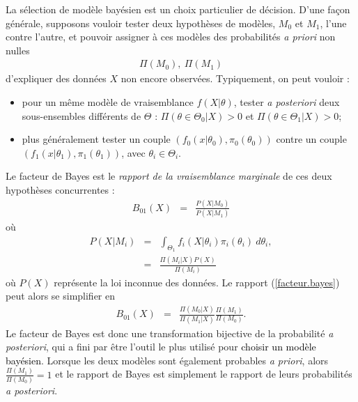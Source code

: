 La sélection de modèle bayésien est un choix particulier de décision. D'une fa\c con générale, supposons vouloir tester deux hypothèses de modèles, $M_0$ et $M_1$, l'une contre l'autre, et pouvoir assigner à ces modèles des probabilités {\it a priori} non nulles
\begin{eqnarray*}
\Pi(M_0), \ \Pi(M_1)
\end{eqnarray*}
d'expliquer des données $X$ non encore observées. Typiquement, on peut vouloir :
\begin{itemize}
    \item pour un même modèle de vraisemblance $f(X|\theta)$, tester {\it a posteriori} deux sous-ensembles  différents de $\Theta$ : $\Pi(\theta\in\Theta_0|X)>0$ et $\Pi(\theta\in\Theta_1|X)>0$;%
    \item plus généralement tester un couple $(f_0(x|\theta_0),\pi_0(\theta_0))$ contre un couple $(f_1(x|\theta_1),\pi_1(\theta_1))$, avec $\theta_i\in\Theta_i$. %
\end{itemize}
 Le facteur de Bayes est le \emph{rapport de  la vraisemblance marginale} de ces deux hypothèses concurrentes :
 \begin{eqnarray}
 B_{01}(X) & = & \frac{P(X|M_0)}{P(X|M_1)}\label{facteur.bayes}
 \end{eqnarray}
 où 
 \begin{eqnarray*}
 P(X|M_i) & = & \int_{\Theta_1} f_i(X|\theta_i)\pi_i(\theta_i) \ d\theta_i, \\
 & = &   \frac{\Pi(M_i|X) P(X)}{\Pi(M_i)}
 \end{eqnarray*}
 où $P(X)$ représente la loi inconnue des données. Le rapport (\ref{facteur.bayes}) peut alors se simplifier en 
  \begin{eqnarray}
 B_{01}(X) & = & \frac{\Pi(M_0|X) }{\Pi(M_1|X) }\frac{\Pi(M_1)}{\Pi(M_0)}. \label{facteur.bayes.2}
 \end{eqnarray}
 Le {facteur de Bayes} est donc une transformation bijective de la probabilité {\it a posteriori}, qui a fini par \^etre l'outil le plus utilisé pour \textcolor{black}{choisir un modèle bayésien}. Lorsque les deux modèles sont également probables {\it a priori}, alors  $\frac{\Pi(M_1)}{\Pi(M_0)}=1$ et le rapport de Bayes est simplement le rapport de leurs probabilités {\it a posteriori}. \\
 
